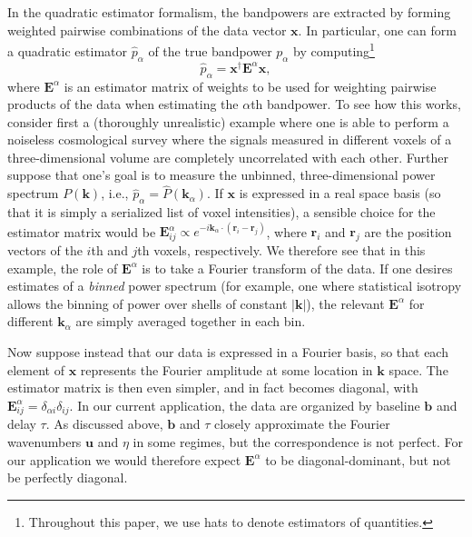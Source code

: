 \documentclass[twocolumn,aps,prd,nofootinbib,showpacs]{revtex4-1}
\begin{document}
In the quadratic estimator formalism, the bandpowers are extracted by forming weighted pairwise combinations of the data vector $\mathbf{x}$.  In particular, one can form a quadratic estimator $\hat{p}_\alpha$ of the true bandpower $p_\alpha$ by computing\footnote{Throughout this paper, we use hats to denote estimators of quantities.}
\begin{equation}
\label{eq:GenQuadEst}
\widehat{p}_\alpha = \mathbf{x}^\dagger \mathbf{E}^\alpha \mathbf{x},
\end{equation}
where $\mathbf{E}^\alpha$ is an estimator matrix of weights to be used for weighting pairwise products of the data when estimating the $\alpha$th bandpower.  To see how this works, consider first a (thoroughly unrealistic) example where one is able to perform a noiseless cosmological survey where the signals measured in different voxels of a three-dimensional volume are completely uncorrelated with each other.  Further suppose that one's goal is to measure the unbinned, three-dimensional power spectrum $P(\mathbf{k})$, i.e., $\widehat{p}_\alpha = \widehat{P}(\mathbf{k}_\alpha)$.  If $\mathbf{x}$ is expressed in a real space basis (so that it is simply a serialized list of voxel intensities), a sensible choice for the estimator matrix would be $\mathbf{E}^\alpha_{ij} \propto e^{-i \mathbf{k}_\alpha \cdot (\mathbf{r}_i - \mathbf{r}_j)}$, where $\mathbf{r}_i$ and $\mathbf{r}_j$ are the position vectors of the $i$th and $j$th voxels, respectively.  We therefore see that in this example, the role of $\mathbf{E}^\alpha$ is to take a Fourier transform of the data.  If one desires estimates of a \emph{binned} power spectrum (for example, one where statistical isotropy allows the binning of power over shells of constant $|\mathbf{k}|$), the relevant $\mathbf{E}^\alpha$ for different $\mathbf{k}_\alpha$ are simply averaged together in each bin.

Now suppose instead that our data is expressed in a Fourier basis, so that each element of $\mathbf{x}$ represents the Fourier amplitude at some location in $\mathbf{k}$ space.  The estimator matrix is then even simpler, and in fact becomes diagonal, with $\mathbf{E}^\alpha_{ij} = \delta_{\alpha i} \delta_{ij}$.  In our current application, the data are organized by baseline $\mathbf{b}$ and delay $\tau$.  As discussed above, $\mathbf{b}$ and $\tau$ closely approximate the Fourier wavenumbers $\mathbf{u}$ and $\eta$ in some regimes, but the correspondence is not perfect.  For our application we would therefore expect $\mathbf{E}^\alpha$ to be diagonal-dominant, but not be perfectly diagonal.
\end{document}
